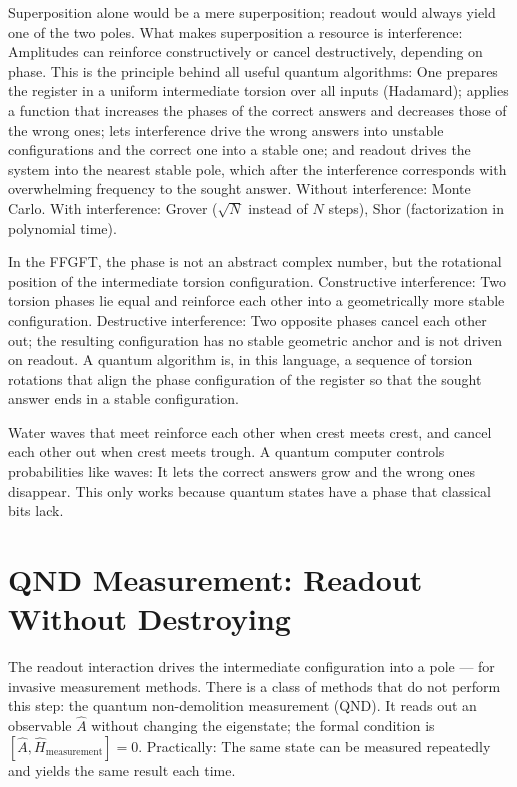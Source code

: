 Superposition alone would be a mere superposition; readout would always
yield one of the two poles. What makes superposition a resource is
interference: Amplitudes can reinforce constructively or
cancel destructively, depending on phase. This is the principle
behind all useful quantum algorithms: One prepares the register
in a uniform intermediate torsion over all inputs (Hadamard);
applies a function that increases the phases of the correct answers
and decreases those of the wrong ones; lets interference drive the wrong
answers into unstable configurations and the correct one into a
stable one; and readout drives the system into the nearest stable
pole, which after the interference corresponds with overwhelming frequency to the
sought answer. Without interference: Monte Carlo. With
interference: Grover ($\sqrt N$ instead of $N$ steps), Shor (factorization
in polynomial time).

In the FFGFT, the phase is not an abstract complex number, but the
rotational position of the intermediate torsion configuration. Constructive
interference: Two torsion phases lie equal and reinforce each other into a
geometrically more stable configuration. Destructive interference:
Two opposite phases cancel each other out; the resulting
configuration has no stable geometric anchor and is not
driven on readout. A quantum algorithm is, in this language, a sequence of torsion rotations that align the phase configuration
of the register so that the sought answer ends in a stable
configuration.

\begin{laierspur}
Water waves that meet reinforce each other when crest meets crest,
and cancel each other out when crest meets trough. A
quantum computer controls probabilities like waves: It lets the
correct answers grow and the wrong ones disappear. This only works
because quantum states have a phase that classical bits lack.
\end{laierspur}

\section{QND Measurement: Readout Without Destroying}

The readout interaction drives the intermediate configuration into
a pole --- for invasive measurement methods. There is a class of
methods that do not perform this step: the
quantum non-demolition measurement (QND). It reads out an observable $\hat A$
without changing the eigenstate; the formal condition is
$[\hat A,\hat H_{\mathrm{measurement}}] = 0$. Practically: The same
state can be measured repeatedly and yields the same
result each time.

